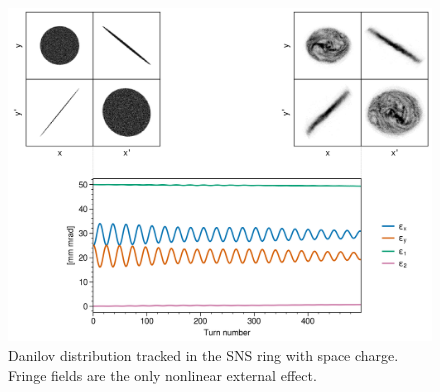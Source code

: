 \begin{figure}[!p]
    \centering
    \includegraphics[width=\textwidth]{Images/chapter3/fringe_spacecharge.png}
    \caption{Danilov distribution tracked in the SNS ring with space charge. Fringe fields are the only nonlinear external effect.}
    \label{fig:fringe_c}
    \vspace*{3cm}
\end{figure}